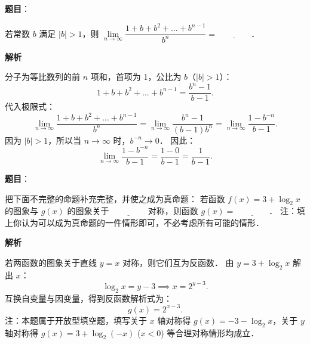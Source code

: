 \begin{answer}

\textbf{题目}：

若常数 $b$ 满足 $|b| > 1$，则 $\lim\limits_{n\to\infty} \dfrac{1 + b + b^2 + \dots + b^{n-1}}{b^n} = \underline{\qquad\qquad}$．

\textbf{解析}

分子为等比数列的前 $n$ 项和，首项为 1，公比为 $b$（$|b| > 1$）：
\nopagebreak[4]
\[
1 + b + b^2 + \dots + b^{n-1} = \frac{b^n - 1}{b - 1}.
\]
代入极限式：
\nopagebreak[4]
\[
\lim_{n\to\infty} \frac{1 + b + b^2 + \dots + b^{n-1}}{b^n} = \lim_{n\to\infty} \frac{b^n - 1}{(b - 1)b^n} = \lim_{n\to\infty} \frac{1 - b^{-n}}{b - 1}.
\]
因为 $|b| > 1$，所以当 $n \to \infty$ 时，$b^{-n} \to 0$．
因此：
\nopagebreak[4]
\[
\lim_{n\to\infty} \frac{1 - b^{-n}}{b - 1} = \frac{1 - 0}{b - 1} = \frac{1}{b - 1}.
\]


\end{answer}
\begin{answer}

\textbf{题目}：

把下面不完整的命题补充完整，并使之成为真命题：
若函数 $f(x) = 3 + \log_2 x$ 的图象与 $g(x)$ 的图象关于 $\underline{\qquad\qquad}$ 对称，则函数 $g(x) = \underline{\qquad\qquad}$．
注：填上你认为可以成为真命题的一件情形即可，不必考虑所有可能的情形．

\textbf{解析}

若两函数的图象关于直线 $y = x$ 对称，则它们互为反函数．
由 $y = 3 + \log_2 x$ 解出 $x$：
\nopagebreak[4]
\[
\log_2 x = y - 3 \implies x = 2^{y - 3}.
\]
互换自变量与因变量，得到反函数解析式为：
\nopagebreak[4]
\[
g(x) = 2^{x - 3}.
\]
注：本题属于开放型填空题，填写关于 $x$ 轴对称得 $g(x) = -3 - \log_2 x$，关于 $y$ 轴对称得 $g(x) = 3 + \log_2(-x)$ ($x < 0$) 等合理对称情形均成立．


\end{answer}


